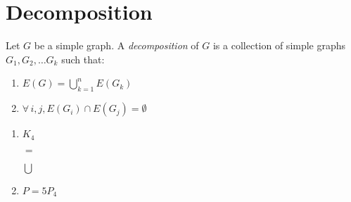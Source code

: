\documentclass[letterpaper,12pt,fleqn]{article}
\begin{document}
\section*{Decomposition}

\begin{definition}[Decomposition]
  Let $G$ be a simple graph. A \emph{decomposition} of $G$ is a collection of
  simple graphs $G_1,G_2,\ldots G_k$ such that:
  \begin{enumerate}
  \item $E(G)=\bigcup_{k=1}^nE(G_k)$
  \item $\forall\,i,j,E(G_i)\cap E(G_j)=\emptyset$
  \end{enumerate}
\end{definition}

\begin{examples}
  \listbreak
  \begin{enumerate}
  \item $K_4$

    \begin{minipage}{1in}
      \centering
    \end{minipage}
    \begin{minipage}{0.5in}
      \centering
      $=$
    \end{minipage}
    \begin{minipage}{1in}
      \centering
    \end{minipage}
    \begin{minipage}{0.5in}
      \centering
      $\bigcup$
    \end{minipage}
    \begin{minipage}{1in}
      \centering
    \end{minipage}

    \bigskip

  \item $P=5P_4$


\end{enumerate}
\end{examples}
\end{document}
